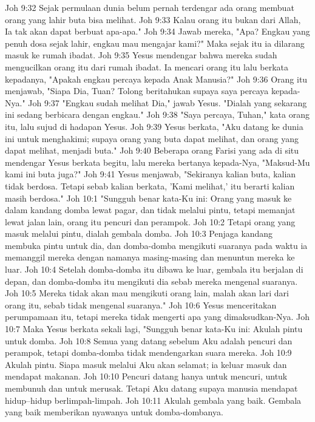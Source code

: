 Joh 9:32  Sejak permulaan dunia belum pernah terdengar ada orang membuat orang yang lahir buta bisa melihat.
Joh 9:33  Kalau orang itu bukan dari Allah, Ia tak akan dapat berbuat apa-apa."
Joh 9:34  Jawab mereka, "Apa? Engkau yang penuh dosa sejak lahir, engkau mau mengajar kami?" Maka sejak itu ia dilarang masuk ke rumah ibadat.
Joh 9:35  Yesus mendengar bahwa mereka sudah mengucilkan orang itu dari rumah ibadat. Ia mencari orang itu lalu berkata kepadanya, "Apakah engkau percaya kepada Anak Manusia?"
Joh 9:36  Orang itu menjawab, "Siapa Dia, Tuan? Tolong beritahukan supaya saya percaya kepada-Nya."
Joh 9:37  "Engkau sudah melihat Dia," jawab Yesus. "Dialah yang sekarang ini sedang berbicara dengan engkau."
Joh 9:38  "Saya percaya, Tuhan," kata orang itu, lalu sujud di hadapan Yesus.
Joh 9:39  Yesus berkata, "Aku datang ke dunia ini untuk menghakimi; supaya orang yang buta dapat melihat, dan orang yang dapat melihat, menjadi buta."
Joh 9:40  Beberapa orang Farisi yang ada di situ mendengar Yesus berkata begitu, lalu mereka bertanya kepada-Nya, "Maksud-Mu kami ini buta juga?"
Joh 9:41  Yesus menjawab, "Sekiranya kalian buta, kalian tidak berdosa. Tetapi sebab kalian berkata, 'Kami melihat,' itu berarti kalian masih berdosa."
Joh 10:1  "Sungguh benar kata-Ku ini: Orang yang masuk ke dalam kandang domba lewat pagar, dan tidak melalui pintu, tetapi memanjat lewat jalan lain, orang itu pencuri dan perampok.
Joh 10:2  Tetapi orang yang masuk melalui pintu, dialah gembala domba.
Joh 10:3  Penjaga kandang membuka pintu untuk dia, dan domba-domba mengikuti suaranya pada waktu ia memanggil mereka dengan namanya masing-masing dan menuntun mereka ke luar.
Joh 10:4  Setelah domba-domba itu dibawa ke luar, gembala itu berjalan di depan, dan domba-domba itu mengikuti dia sebab mereka mengenal suaranya.
Joh 10:5  Mereka tidak akan mau mengikuti orang lain, malah akan lari dari orang itu, sebab tidak mengenal suaranya."
Joh 10:6  Yesus menceritakan perumpamaan itu, tetapi mereka tidak mengerti apa yang dimaksudkan-Nya.
Joh 10:7  Maka Yesus berkata sekali lagi, "Sungguh benar kata-Ku ini: Akulah pintu untuk domba.
Joh 10:8  Semua yang datang sebelum Aku adalah pencuri dan perampok, tetapi domba-domba tidak mendengarkan suara mereka.
Joh 10:9  Akulah pintu. Siapa masuk melalui Aku akan selamat; ia keluar masuk dan mendapat makanan.
Joh 10:10  Pencuri datang hanya untuk mencuri, untuk membunuh dan untuk merusak. Tetapi Aku datang supaya manusia mendapat hidup--hidup berlimpah-limpah.
Joh 10:11  Akulah gembala yang baik. Gembala yang baik memberikan nyawanya untuk domba-dombanya.

